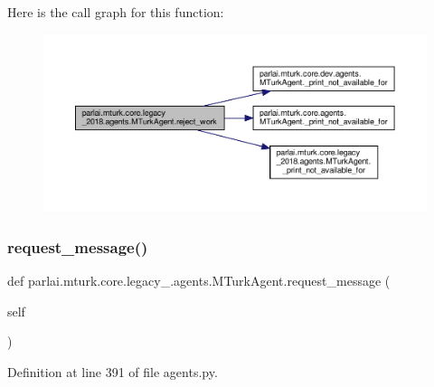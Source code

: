 Here is the call graph for this function\+:
\nopagebreak
\begin{figure}[H]
\begin{center}
\leavevmode
\includegraphics[width=350pt]{classparlai_1_1mturk_1_1core_1_1legacy__2018_1_1agents_1_1MTurkAgent_a9343b55ce980daa021253197a1852668_cgraph}
\end{center}
\end{figure}
\mbox{\label{classparlai_1_1mturk_1_1core_1_1legacy__2018_1_1agents_1_1MTurkAgent_a7c3620ae641e70de1b9d212910ec1158}} 
\subsubsection{\texorpdfstring{request\+\_\+message()}{request\_message()}}
{\footnotesize\ttfamily def parlai.\+mturk.\+core.\+legacy\+\_.\+agents.\+M\+Turk\+Agent.\+request\+\_\+message (\begin{DoxyParamCaption}\item[{}]{self }\end{DoxyParamCaption})}



Definition at line 391 of file agents.\+py.



